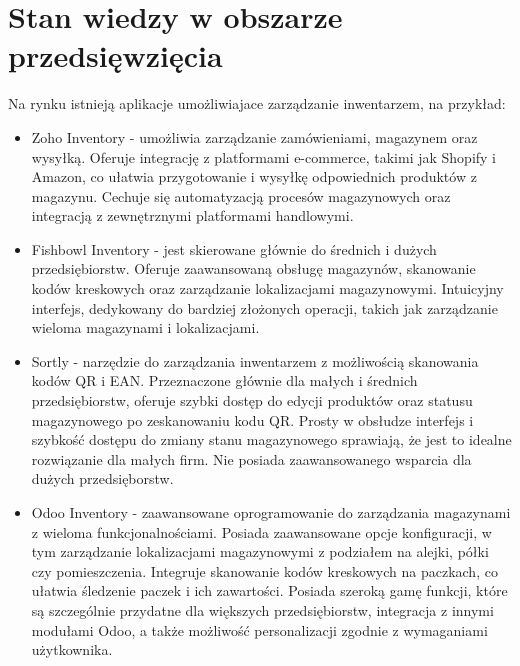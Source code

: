 \documentclass[../main.tex]{subfiles}
\begin{document}
\section{Stan wiedzy w obszarze przedsięwzięcia}

Na rynku istnieją aplikacje umożliwiajace zarządzanie inwentarzem, na przykład: 
\begin{itemize}
    \item Zoho Inventory\cite{zoho} - umożliwia zarządzanie zamówieniami, magazynem oraz wysyłką. Oferuje integrację z platformami e-commerce, takimi jak Shopify i Amazon, co ułatwia przygotowanie i wysyłkę odpowiednich produktów z magazynu. Cechuje się automatyzacją procesów magazynowych oraz integracją z zewnętrznymi platformami handlowymi.
    \item Fishbowl Inventory\cite{fishbowl} - jest skierowane głównie do średnich i dużych przedsiębiorstw. Oferuje zaawansowaną obsługę magazynów, skanowanie kodów kreskowych oraz zarządzanie lokalizacjami magazynowymi. Intuicyjny interfejs, dedykowany do bardziej złożonych operacji, takich jak zarządzanie wieloma magazynami i lokalizacjami.
    \item Sortly\cite{sortly} - narzędzie do zarządzania inwentarzem z możliwością skanowania kodów QR i EAN. Przeznaczone głównie dla małych i średnich przedsiębiorstw, oferuje szybki dostęp do edycji produktów oraz statusu magazynowego po zeskanowaniu kodu QR. Prosty w obsłudze interfejs i szybkość dostępu do zmiany stanu magazynowego sprawiają, że jest to idealne rozwiązanie dla małych firm. Nie posiada zaawansowanego wsparcia dla dużych przedsięborstw.
    \item Odoo Inventory\cite{odoo} - zaawansowane oprogramowanie do zarządzania magazynami z wieloma funkcjonalnościami. Posiada zaawansowane opcje konfiguracji, w tym zarządzanie lokalizacjami magazynowymi z podziałem na alejki, półki czy pomieszczenia. Integruje skanowanie kodów kreskowych na paczkach, co ułatwia śledzenie paczek i ich zawartości. Posiada szeroką gamę funkcji, które są szczególnie przydatne dla większych przedsiębiorstw, integracja z innymi modułami Odoo, a także możliwość personalizacji zgodnie z wymaganiami użytkownika.
\end{itemize}
\end{document}

